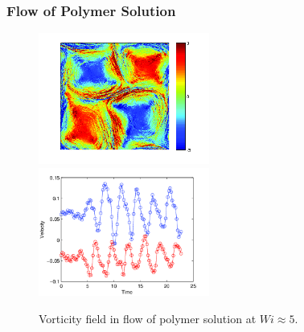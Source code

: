 \begin{frame}
  \frametitle{Flow of Polymer Solution}
\begin{figure}[ht]
\includegraphics[width=0.5\textwidth]{img/polymer_loc-12.png}
\includegraphics[width=0.5\textwidth]{img/polymer_loc-7.png}
\caption{Vorticity field in flow of polymer solution at $Wi\approx5$.}
\label{fug:vor_pol5}
\end{figure}
\end{frame}
